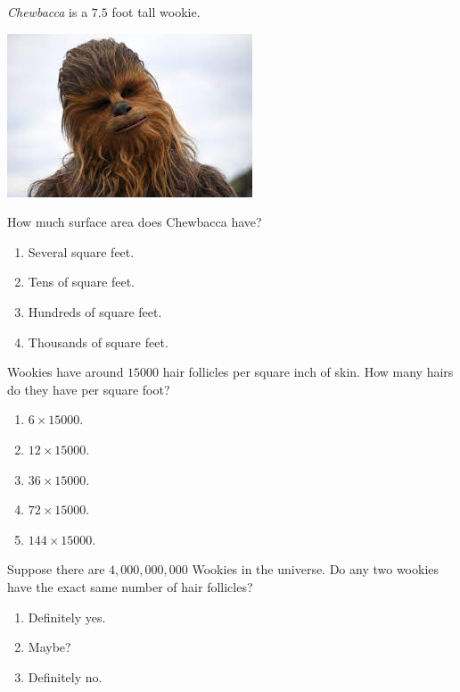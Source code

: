\documentclass[handout,noauthor,nooutcomes]{ximera}
\begin{document}
\begin{exercise}
  \textit{Chewbacca} is a $7.5$ foot tall wookie.
  \begin{center}
    \includegraphics{chewbacca.jpeg}
  \end{center}
  How much surface area does Chewbacca have?
  \begin{enumerate}
  \item Several square feet.
  \item Tens of square feet.
  \item Hundreds of square feet.
  \item Thousands of square feet.
  \end{enumerate}
  \end{exercise}



\begin{exercise}
  Wookies have around $15000$ hair follicles per square inch of
  skin. How many hairs do they have per square foot?
  \begin{enumerate}
  \item $6\times 15000$.
  \item $12\times 15000$.
  \item $36\times 15000$.
  \item $72\times 15000$.
  \item $144\times 15000$.
  \end{enumerate}
\end{exercise}


\begin{exercise}
  Suppose there are $4,000,000,000$ Wookies in the universe. Do any
  two wookies have the exact same number of hair follicles?
  \begin{enumerate}
  \item Definitely yes. %
  \item Maybe?
  \item Definitely no.
  \end{enumerate}
  
\end{exercise}




\end{document}
